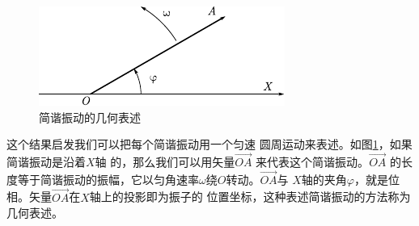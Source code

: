 \begin{figure}
    \centering
    \includegraphics{figure/fig07.07}
    \caption{简谐振动的几何表述}
    \label{fig:07.07}
\end{figure}
这个结果启发我们可以把每个简谐振动用一个匀速
圆周运动来表述。如图\ref{fig:07.07}，如果简谐振动是沿着$ X $轴
的，那么我们可以用矢量$ \vec{ OA } $
来代表这个简谐振动。$ \vec{ OA } $
的长度等于简谐振动的振幅，它以匀角速率$ \omega $绕$ O $转动。$ \vec{ OA } $与
$ X $轴的夹角$ \varphi $，就是位相。矢量$ \vec{ OA } $在$ X $轴上的投影即为振子的
位置坐标，这种表述简谐振动的方法称为几何表述。
